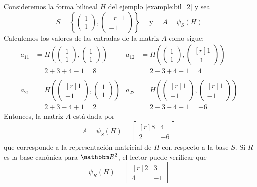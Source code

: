 \begin{example}
    Consideremos la forma bilineal $H$ del ejemplo \ref{example:bil_2} y sea
    $$S = \left\{ \begin{pmatrix} 1 \\ 1 \end{pmatrix}, \begin{pmatrix*}[r] 1 \\ -1 \end{pmatrix*} \right\} \quad \text{ y } \quad A = \psi_S(H)$$
    Calculemos los valores de las entradas de la matriz $A$ como sigue:
    \begin{align*}
        a_{11} & = H \left( \begin{pmatrix} 1 \\ 1 \end{pmatrix}, \begin{pmatrix} 1 \\ 1 \end{pmatrix} \right) & a_{12} & = H \left( \begin{pmatrix} 1 \\ 1 \end{pmatrix}, \begin{pmatrix*}[r] 1 \\ -1 \end{pmatrix*} \right) \\
        & = 2 + 3 + 4 - 1 = 8 & & = 2 - 3 + 4 + 1 = 4 \\
        & \\
        a_{21} & = H \left( \begin{pmatrix*}[r] 1 \\ -1 \end{pmatrix*}, \begin{pmatrix} 1 \\ 1 \end{pmatrix} \right) & a_{22} & = H \left( \begin{pmatrix*}[r] 1 \\ -1 \end{pmatrix*}, \begin{pmatrix*}[r] 1 \\ -1 \end{pmatrix*} \right) \\
        & = 2 + 3 - 4 + 1 = 2 & & = 2 - 3 - 4 - 1 = -6
    \end{align*}
    Entonces, la matriz $A$ está dada por
    $$A = \psi_S(H) = \begin{bmatrix*}[r] 8 & 4 \\ 2 & -6 \end{bmatrix*}$$
    que corresponde a la representación matricial de $H$ con respecto a la base $S$. Si $R$ es la base canónica para $\RR[2]$, el lector puede verificar que
    $$\psi_R(H) = \begin{bmatrix*}[r]
        2 & 3 \\
        4 & -1
    \end{bmatrix*}$$
\end{example}

